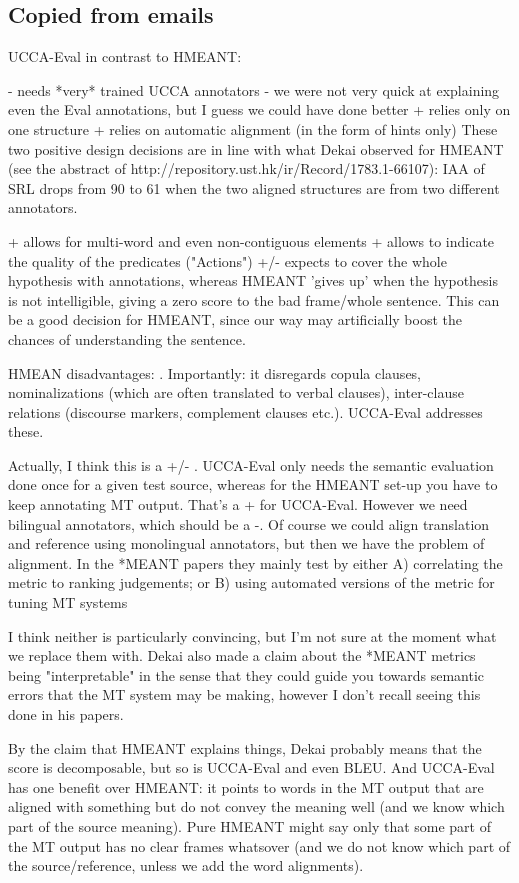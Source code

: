 \documentclass[11pt]{article}
\begin{document}
\subsection{Copied from emails}


UCCA-Eval in contrast to HMEANT:

- needs *very* trained UCCA annotators
- we were not very quick at explaining even the Eval annotations, but I guess we could have done better
+ relies only on one structure
+ relies on automatic alignment (in the form of hints only)
These two positive design decisions are in line with what Dekai observed for HMEANT
(see the abstract of http://repository.ust.hk/ir/Record/1783.1-66107): IAA of SRL drops from 90
to 61 when the two aligned structures are from two different annotators.

+ allows for multi-word and even non-contiguous elements
+ allows to indicate the quality of the predicates ("Actions")
+/- expects to cover the whole hypothesis with annotations, whereas HMEANT 'gives up' when the
hypothesis is not intelligible, giving a zero score to the bad frame/whole sentence.
This can be a good decision for HMEANT, since our way may artificially boost the chances of
understanding the sentence.


HMEAN disadvantages:
. Importantly: it disregards copula clauses, nominalizations (which are often translated to verbal clauses), inter-clause relations (discourse markers, complement clauses etc.). UCCA-Eval addresses these.

Actually, I think this is a +/- . UCCA-Eval only needs the semantic evaluation done once for a given test source, whereas for the HMEANT set-up you have to keep annotating MT output. That's a + for UCCA-Eval. However we need bilingual annotators, which should be a -. Of course we could align translation and reference using monolingual annotators, but then we have the problem of alignment.
In the *MEANT papers they mainly test by either
A) correlating the metric to ranking judgements; or
B) using automated versions of the metric for tuning MT systems

I think neither is particularly convincing, but I'm not sure at the moment what we replace them with. Dekai also made a claim about the *MEANT metrics being "interpretable" in the sense that they could guide you towards semantic errors that the MT system may be making, however I don't recall seeing this done in his papers. 


By the claim that HMEANT explains things, Dekai probably means that the score is decomposable, but so is UCCA-Eval and even BLEU. And UCCA-Eval has one benefit over HMEANT: it points to words in the MT output that are aligned with something but do not convey the meaning well (and we know which part of the source meaning). Pure HMEANT might say only that some part of the MT output has no clear frames whatsover (and we do not know which part of the source/reference, unless we add the word alignments).
\end{document}
